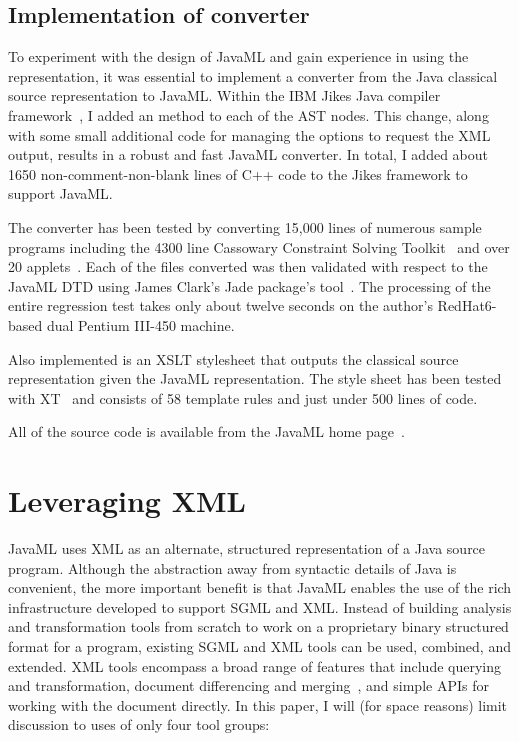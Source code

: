 \documentclass{article}
\begin{document}
\begin{multicols}{2}
\subsection{Implementation of converter}

To experiment with the design of JavaML and gain experience in using the
representation, it was essential to implement a converter from the Java
classical source representation to JavaML.  Within the IBM Jikes Java
compiler framework~\cite{Jikes}, I added an  method
to each of the AST nodes. This change, along with some small additional
code for managing the options to request the XML output, results in a
robust and fast JavaML converter.  In total, I added about 1650
non-comment-non-blank lines of C++ code to the Jikes framework to
support JavaML.

The converter has been tested by converting 15,000 lines of numerous
sample programs including the 4300 line Cassowary Constraint Solving
Toolkit~\cite{CassoInI} and over 20 applets~\cite{SunApplets}.  Each of
the files converted was then validated with respect to the JavaML DTD
using James Clark's Jade package's  tool~\cite{Jade}.
The processing of the entire regression test takes only about twelve
seconds on the author's RedHat6-based dual Pentium III-450 machine.

Also implemented is an XSLT stylesheet that outputs the
classical source representation given the JavaML representation. The
style sheet has been tested with XT~\cite{Clark-XT} and consists of 58
template rules and just under 500 lines of code. 

All of the source code is available from the JavaML home
page~\cite{Badros-javaml}.

\section{Leveraging XML}
\label{sec-leveraging}

JavaML uses XML as an alternate, structured representation of a Java
source program.  Although the abstraction away from syntactic details of
Java is convenient, the more important benefit is that JavaML enables
the use of the rich infrastructure developed to support SGML and XML.
Instead of building analysis and transformation tools from scratch to
work on a proprietary binary structured format for a program, existing
SGML and XML tools can be used, combined, and extended.  XML tools
encompass a broad range of features that include querying and
transformation, document differencing and merging~\cite{XMLDiffMerge},
and simple APIs for working with the document directly.  In this paper,
I will (for space reasons) limit discussion to uses of only four tool
groups:


\end{multicols}
\end{document}
